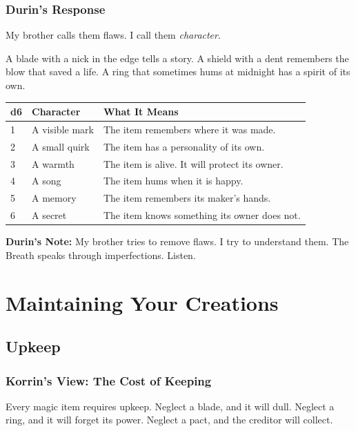 \documentclass[11pt]{book}
\begin{document}
\subsection*{Durin's Response}

My brother calls them flaws. I call them \textit{character}.

A blade with a nick in the edge tells a story. A shield with a dent remembers the blow that saved a life. A ring that sometimes hums at midnight has a spirit of its own.

\begin{table}[h]
\centering
\begin{tabular}{@{}lll@{}}
\toprule
\textbf{d6} & \textbf{Character} & \textbf{What It Means} \\
\midrule
1 & A visible mark & The item remembers where it was made. \\
2 & A small quirk & The item has a personality of its own. \\
3 & A warmth & The item is alive. It will protect its owner. \\
4 & A song & The item hums when it is happy. \\
5 & A memory & The item remembers its maker's hands. \\
6 & A secret & The item knows something its owner does not. \\
\bottomrule
\end{tabular}
\end{table}

\vspace{0.5cm}
\textbf{Durin's Note:} My brother tries to remove flaws. I try to understand them. The Breath speaks through imperfections. Listen.

\newpage
\chapter{Maintaining Your Creations}

\section{Upkeep}

\subsection*{Korrin's View: The Cost of Keeping}

Every magic item requires upkeep. Neglect a blade, and it will dull. Neglect a ring, and it will forget its power. Neglect a pact, and the creditor will collect.
\end{document}
